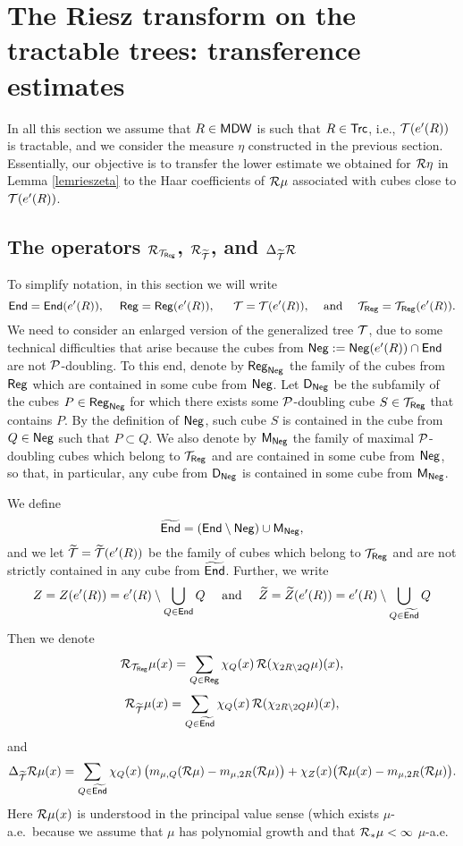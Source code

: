 

\section{The Riesz transform on the tractable trees: transference estimates}\label{sec99}

 In all this section we assume that $R\in{\mathsf{MDW}}$ is such that $R\in{\mathsf{Trc}}$, i.e., ${\mathcal T}(e'(R))$ is tractable, and we consider the measure $\eta$ constructed in the previous section.
Essentially, our objective is to transfer the lower estimate we obtained for ${\mathcal R}\eta$ in Lemma \ref{lemrieszeta} to 
the Haar coefficients of
${\mathcal R}\mu$ associated with cubes close to ${\mathcal T}(e'(R))$.

\subsection{The operators \texorpdfstring{${\mathcal R}_{{\mathcal T}_{\mathsf{Reg}}}$, ${\mathcal R}_{{\widetilde{{\mathcal T}}}}$,  and $\Delta_{{\widetilde{{\mathcal T}}}}{\mathcal R}$}{R\_{TReg}, R\_{T},  and Delta\_{T}R}}\label{sec7.1}

To simplify notation, in this section we will write
$${\mathsf{End}}={\mathsf{End}}(e'(R)), \quad \;{\mathsf{Reg}} = {\mathsf{Reg}}(e'(R)),\; \quad \;{\mathcal T} = {\mathcal T}(e'(R)),\quad\,\text{and}\quad\; {\mathcal T}_{\mathsf{Reg}} = {\mathcal T}_{\mathsf{Reg}}(e'(R)).$$
We need to consider an enlarged version of the generalized tree ${\mathcal T}$, due to some technical difficulties that arise because the cubes from ${\mathsf{Neg}}:= {\mathsf{Neg}}(e'(R))\cap{\mathsf{End}}$ are not ${\mathcal P}$-doubling.
To this end, denote by ${\mathsf{Reg}}_{\mathsf{Neg}}$ the family of the cubes from ${\mathsf{Reg}}$ which are contained in some cube from ${\mathsf{Neg}}$.
Let ${\mathsf{D}}_{\mathsf{Neg}}$ be the subfamily of the cubes $P\in{\mathsf{Reg}}_{\mathsf{Neg}}$ for which there exists some
${\mathcal P}$-doubling cube $S\in{\mathcal T}_{\mathsf{Reg}}$ that contains $P$. By the definition of ${\mathsf{Neg}}$, such cube $S$ is contained in the cube from $Q\in{\mathsf{Neg}}$ such that $P\subset Q$. 
We also denote by ${\mathsf{M}}_{\mathsf{Neg}}$ the family of maximal ${\mathcal P}$-doubling cubes which belong to ${\mathcal T}_{\mathsf{Reg}}$ and are contained in some
cube from ${\mathsf{Neg}}$, so that, in particular, any cube from ${\mathsf{D}}_{\mathsf{Neg}}$ is contained in some cube from ${\mathsf{M}}_{\mathsf{Neg}}$.

We define
$${\widetilde{{\mathsf{End}}}} = ({\mathsf{End}} \setminus {\mathsf{Neg}}) \cup {\mathsf{M}}_{\mathsf{Neg}},$$
and we let ${\widetilde{{\mathcal T}}}={\widetilde{{\mathcal T}}}(e'(R))$ be the family of cubes which belong to ${\mathcal T}_{\mathsf{Reg}}$ and are not strictly contained in any cube from ${\widetilde{{\mathsf{End}}}}$.
Further, we write
\begin{equation}\label{eqdef*f}
Z = Z(e'(R)) = e'(R)\setminus \bigcup_{Q\in{\mathsf{End}}} Q\quad \text{ and }\quad{\widetilde{Z}} = {\widetilde{Z}}(e'(R)) = e'(R)\setminus \bigcup_{Q\in{\widetilde{{\mathsf{End}}}}} Q
\end{equation}
Then we denote
$${\mathcal R}_{{\mathcal T}_{\mathsf{Reg}}}\mu(x) = \sum_{Q\in{\mathsf{Reg}}} \chi_Q(x)\,{\mathcal R}(\chi_{2R\setminus 2Q}\mu)(x),$$
$${\mathcal R}_{{\widetilde{{\mathcal T}}}}\mu(x) = \sum_{Q\in{\widetilde{{\mathsf{End}}}}} \chi_Q(x)\,{\mathcal R}(\chi_{2R\setminus 2Q}\mu)(x),$$
and
$$\Delta_{{\widetilde{{\mathcal T}}}}{\mathcal R}\mu(x) = \sum_{Q\in{\widetilde{{\mathsf{End}}}}} \chi_Q(x)\,\big(m_{\mu,Q}({\mathcal R}\mu) - m_{\mu,2R}({\mathcal R}\mu)\big)
+ \chi_{Z}(x) \big({\mathcal R}\mu(x) -  m_{\mu,2R}({\mathcal R}\mu)\big)
.$$
Here ${\mathcal R}\mu(x)$ is understood in the principal value sense (which exists $\mu$-a.e.\ because we assume that
$\mu$ has polynomial growth and that ${\mathcal R}_*\mu<\infty$ $\mu$-a.e.

